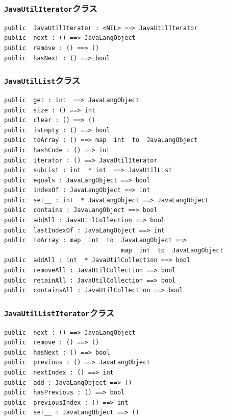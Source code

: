 \documentclass[\pformat,12pt]{jarticle}
\begin{document}
\subsubsection{\texttt{JavaUtilIterator}クラス}
\begin{small}
\begin{verbatim}
public  JavaUtilIterator : <NIL> ==> JavaUtilIterator
public  next : () ==> JavaLangObject
public  remove : () ==> ()
public  hasNext : () ==> bool
\end{verbatim}
\end{small}

\subsubsection{\texttt{JavaUtilList}クラス}
\begin{small}
\begin{verbatim}
public  get : int  ==> JavaLangObject
public  size : () ==> int
public  clear : () ==> ()
public  isEmpty : () ==> bool
public  toArray : () ==> map  int  to  JavaLangObject
public  hashCode : () ==> int
public  iterator : () ==> JavaUtilIterator
public  subList : int  * int  ==> JavaUtilList
public  equals : JavaLangObject ==> bool
public  indexOf : JavaLangObject ==> int
public  set__ : int  * JavaLangObject ==> JavaLangObject
public  contains : JavaLangObject ==> bool
public  addAll : JavaUtilCollection ==> bool
public  lastIndexOf : JavaLangObject ==> int
public  toArray : map  int  to  JavaLangObject ==> 
                                map  int  to  JavaLangObject
public  addAll : int  * JavaUtilCollection ==> bool
public  removeAll : JavaUtilCollection ==> bool
public  retainAll : JavaUtilCollection ==> bool
public  containsAll : JavaUtilCollection ==> bool
\end{verbatim}
\end{small}

\subsubsection{\texttt{JavaUtilListIterator}クラス}
\begin{small}
\begin{verbatim}
public  next : () ==> JavaLangObject
public  remove : () ==> ()
public  hasNext : () ==> bool
public  previous : () ==> JavaLangObject
public  nextIndex : () ==> int
public  add : JavaLangObject ==> ()
public  hasPrevious : () ==> bool
public  previousIndex : () ==> int
public  set__ : JavaLangObject ==> ()
\end{verbatim}
\end{small}
\end{document}
